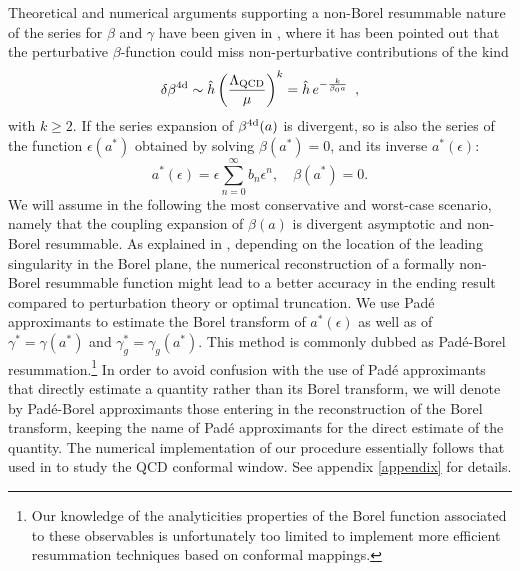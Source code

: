 \documentclass [11pt]{article}
\begin{document}
Theoretical and numerical arguments supporting a non-Borel resummable nature of the series for $\beta$ and $\gamma$ have been given in \cite{DiPietro:2020jne}, where it has been pointed out that the
perturbative $\beta$-function could miss non-perturbative contributions of the kind
\begin{equation}
\delta\beta^{{\rm 4d}}\sim  \hat{h} \left(\frac{\Lambda_{\text{QCD}}}{\mu}\right)^k = \hat{h} \,e^{-\frac{k}{\beta_0 a}}~\,,
\label{eq:betaNP}
\end{equation}
with $k\geq 2$. If the series expansion of $\beta^{{\rm 4d}}(a)$ is divergent, so is also the series of the function $\epsilon(a^*)$ obtained by solving $\beta(a^*) = 0$, and its inverse
$a^*(\epsilon)$: 
\begin{equation}
a^*(\epsilon)=\epsilon\sum_{n=0}^\infty b_n \epsilon^n, \quad \beta(a^*)=0.
\label{eqn:48}
\end{equation} 
We will assume in the following the most conservative and worst-case scenario, namely that the coupling expansion of $\beta(a)$ is divergent asymptotic and non-Borel resummable. As explained in \cite{DiPietro:2020jne}, depending on the location of the leading singularity in the Borel plane, the numerical reconstruction of a formally non-Borel resummable function might lead to a better accuracy in the ending result compared to perturbation theory or optimal truncation.
We use Pad\'e approximants to estimate the Borel transform of $a^*(\epsilon)$ as well as of $\gamma^*=\gamma(a^*)$ and $\gamma_g^* = \gamma_g(a^*)$.
This method is commonly dubbed as Pad\'e-Borel resummation.\footnote{Our knowledge of the analyticities properties of the Borel function associated to these observables is unfortunately too
limited to implement more efficient resummation techniques based on conformal mappings.}
In order to avoid confusion with the use of Pad\'e approximants that directly estimate a quantity rather than its Borel transform,
we will denote by Pad\'e-Borel approximants those entering in the reconstruction of the Borel transform, keeping the name of Pad\'e approximants for the direct estimate of the quantity.
The numerical implementation of our procedure essentially follows that used in \cite{DiPietro:2020jne} to study the QCD conformal window. 
See appendix \ref{appendix} for details.
\end{document}
